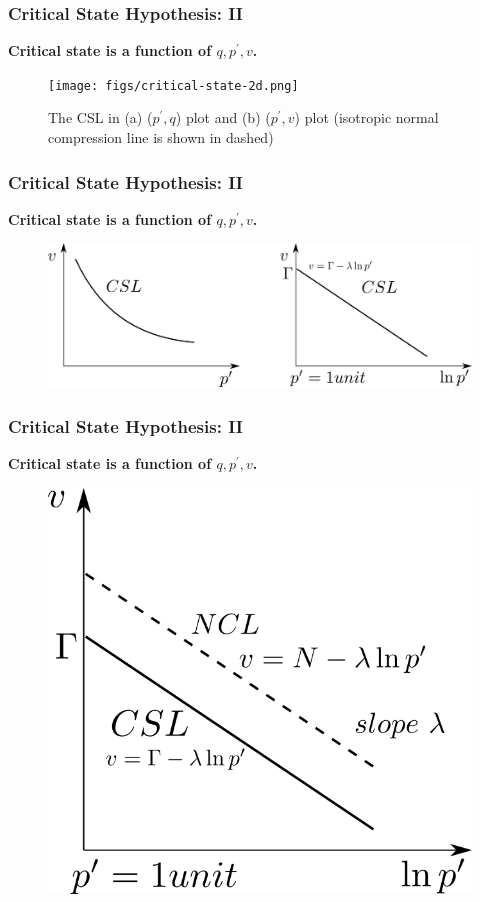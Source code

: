 \documentclass[notes]{beamer}
\begin{document}
\begin{frame}
\frametitle{Critical State Hypothesis: II}
\textbf{Critical state is a function of $q, p^\prime, v$. }
\begin{figure}
	\texttt{[image: figs/critical-state-2d.png]}
	\caption*{The CSL in (a) ($p^\prime, q$) plot and (b) ($p^\prime, v$) plot (isotropic normal compression line is shown in dashed)}
\end{figure}
\end{frame}

\begin{frame}
\frametitle{Critical State Hypothesis: II}
\textbf{Critical state is a function of $q, p^\prime, v$. }
\begin{figure}
	\includegraphics[width=\textwidth]{figs/v-lnp.png}
\end{figure}
\end{frame}

\begin{frame}
\frametitle{Critical State Hypothesis: II}
\textbf{Critical state is a function of $q, p^\prime, v$. }
\begin{figure}
	\includegraphics[width=\textwidth]{figs/csl-ncl.png}
\end{figure}
\end{frame}
\end{document}
